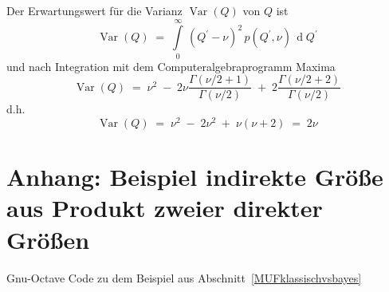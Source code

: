 Der Erwartungswert für die Varianz $\operatorname{Var}(Q)$ von $Q$ ist
\begin{equation}
\operatorname{Var}(Q) \; = \; \int\limits_{0}^{\infty} \, (Q^\prime
- \nu)^2 \, p(Q^\prime,\nu) \,
\operatorname{d}Q^\prime
\end{equation}
und nach Integration mit dem Computeralgebraprogramm Maxima
\begin{equation}
\operatorname{Var}(Q) \; = \; \nu^2 \; - \;
2 \nu \frac{\Gamma(\nu/2 + 1)}{\Gamma(\nu/2)} \; + \;
2 \frac{\Gamma(\nu/2 + 2)}{\Gamma(\nu/2)}
\end{equation}
d.h.
\begin{equation}
\operatorname{Var}(Q) \; = \; \nu^2 \; - \; 2 \nu^2 \; + \; \nu (\nu+2) \; = \; 2 \nu
\end{equation}

\newpage

\section{Anhang: Beispiel indirekte Größe aus Produkt zweier direkter Größen}
\label{AnhangBayesBeispiel}
Gnu-Octave Code zu dem Beispiel aus Abschnitt~\ref{MUFklassischvsbayes}






